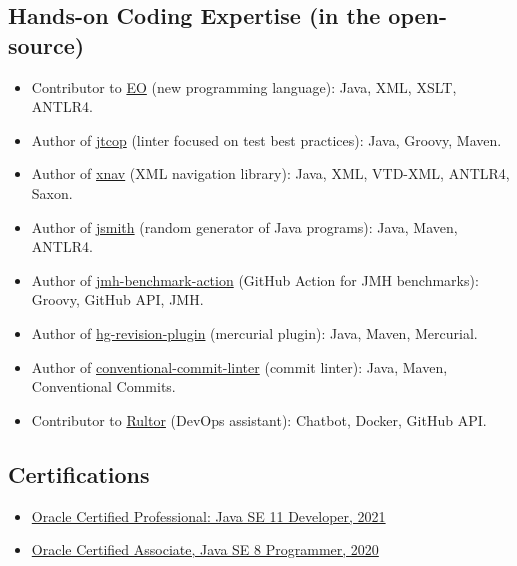 \documentclass{vl}
\begin{document}
    \subsection*{Hands-on Coding Expertise (in the open-source)}
    \begin{itemize}
        \itemsep0em
        \item Contributor to \href{https://www.eolang.org}{EO} (new programming language):
        Java, XML, XSLT, ANTLR4.
        \item Author of  \href{https://github.com/volodya-lombrozo/jtcop}{jtcop} (linter focused on test best practices):
        Java, Groovy, Maven.
        \item Author of \href{https://github.com/volodya-lombrozo/xnav}{xnav} (XML navigation library): Java, XML,
        VTD-XML, ANTLR4, Saxon.
        \item Author of \href{https://github.com/volodya-lombrozo/jsmith}{jsmith} (random generator of Java programs):
        Java, Maven, ANTLR4.
        \item Author of \href{https://github.com/volodya-lombrozo/jmh-benchmark-action}{jmh-benchmark-action}
        (GitHub Action for JMH benchmarks): Groovy, GitHub API, JMH.
        \item Author of \href{https://github.com/volodya-lombrozo/hg-revision-plugin}{hg-revision-plugin}
        (mercurial plugin): Java, Maven, Mercurial.
        \item Author of
        \href{https://github.com/volodya-lombrozo/conventional-commit-linter}{conventional-commit-linter}
        (commit linter): Java, Maven, Conventional Commits.
        \item Contributor to \href{https://www.rultor.com}{Rultor} (DevOps assistant): Chatbot, Docker, GitHub API.
    \end{itemize}

    \subsection*{Certifications}

    \begin{itemize}
        \itemsep0em
        \item \href{https://catalog-education.oracle.com/pls/certview/sharebadge?id=87F6A2FE819A5A5AF4120A05900AB28A461EE9A3EE9FBFA02721FADAEB3BCE19}{Oracle Certified Professional: Java SE 11 Developer, 2021}
        \item \href{https://www.credly.com/badges/e2d9ddda-20dc-433d-8ab7-18548fd0fd8f/public_url}{Oracle Certified Associate, Java SE 8 Programmer, 2020}
    \end{itemize}
\end{document}
